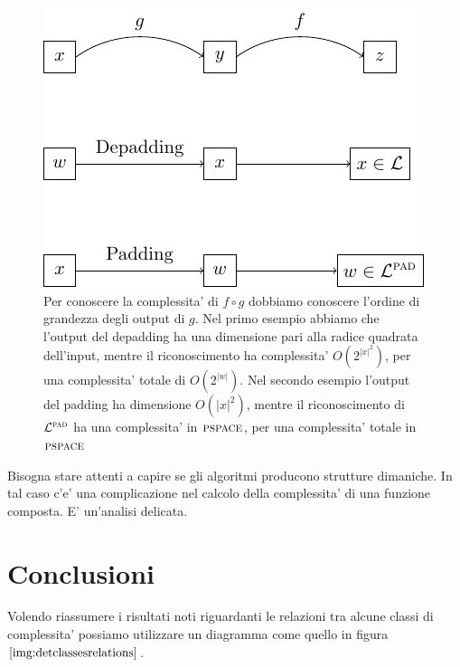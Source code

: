 \begin{figure}[!h]
    \begin{center}
        \includegraphics{./img/timespacehierarchies/FunctionsComposition.pdf}
        \caption{Per conoscere la complessita' di $f \circ g$ dobbiamo conoscere l'ordine di
        grandezza degli output di $g$. Nel primo esempio abbiamo che l'output del depadding ha una
        dimensione pari alla radice quadrata dell'input, mentre il riconoscimento ha complessita'
        $O(2^{|x|^{2}})$, per una complessita' totale di $O(2^{|w|})$. Nel secondo esempio l'output
        del padding ha dimensione $O(|x|^{2})$, mentre il riconoscimento di $\mathcal{L}^{\textsc{pad}}$ ha una
        complessita' in $\textsc{pspace}$, per una complessita' totale in $\textsc{pspace}$}
    \end{center}
\end{figure}

Bisogna stare attenti a capire se gli algoritmi producono strutture dimaniche. In tal caso c'e' una
complicazione nel calcolo della complessita' di una funzione composta. E' un'analisi delicata.

\section{Conclusioni}

Volendo riassumere i risultati noti riguardanti le relazioni tra alcune classi di complessita'
possiamo utilizzare un diagramma come quello in figura $\ref{img:detclassesrelations}$. 

